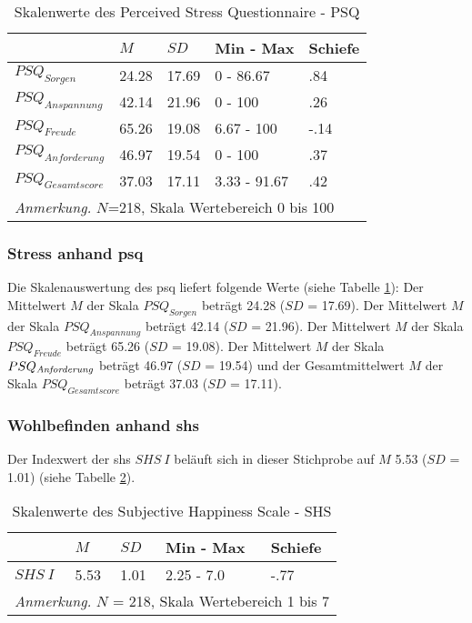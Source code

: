 \begin{table}[ht]
\centering
\captionsetup{margin=70pt, skip=5pt}
\caption{Skalenwerte des Perceived Stress Questionnaire - PSQ}
\label{table:PSQDeskriptiv}
\begin{tabular}{m{6em} m{3em}  m{3em}  m{5em} m{3em}} 
  \hline
  & $M$ & $SD$ & Min - Max & Schiefe\\
  \hline
  $PSQ_{Sorgen}$ & 24.28 & 17.69 & 0 - 86.67 & .84 \\
  $PSQ_{Anspannung}$ & 42.14 & 21.96 & 0 - 100 & .26\\
  $PSQ_{Freude}$ & 65.26 & 19.08 & 6.67 - 100 & -.14\\
  $PSQ_{Anforderung}$ & 46.97 & 19.54 & 0 - 100 & .37 \\
  $PSQ_{Gesamtscore}$ & 37.03 & 17.11 & 3.33 - 91.67 & .42\\
  \hline
  \multicolumn{5}{l}{\textit{Anmerkung.} $N$=218, Skala Wertebereich 0 bis 100}\\
\end{tabular}
\end{table}

\subsubsection{Stress anhand \acrshort{psq}}
Die Skalenauswertung des \acrfull{psq} liefert folgende Werte (siehe Tabelle \ref{table:PSQDeskriptiv}): Der Mittelwert $M$ der Skala $PSQ_{Sorgen}$ beträgt 24.28 ($SD$ = 17.69). Der Mittelwert $M$ der Skala $PSQ_{Anspannung}$ beträgt 42.14 ($SD$ = 21.96). Der Mittelwert $M$ der Skala $PSQ_{Freude}$ beträgt 65.26 ($SD$ = 19.08). Der Mittelwert $M$ der Skala $PSQ_{\text{\textit{Anforderung}}}$ beträgt 46.97 ($SD$ = 19.54) und der Gesamtmittelwert $M$ der Skala $PSQ_{Gesamtscore}$ beträgt 37.03 ($SD$ = 17.11).


\subsubsection{Wohlbefinden anhand \acrshort{shs}}
Der Indexwert der \acrfull{shs} $SHS~I$ beläuft sich in dieser Stichprobe auf $M$ 5.53 ($SD$ = 1.01) (siehe Tabelle \ref{table:SHSDeskriptiv}).

\begin{table}[ht]
\centering
\captionsetup{margin=80pt, skip=5pt}
\caption{Skalenwerte des Subjective Happiness Scale - SHS}
\label{table:SHSDeskriptiv}
\begin{tabular}{m{6em} m{3em}  m{3em}  m{5em} m{3em}} 
  \hline
  & $M$ & $SD$ & Min - Max & Schiefe\\
  \hline
  $SHS~I$ & 5.53 & 1.01 & 2.25 - 7.0 & -.77 \\
  \hline
  \multicolumn{5}{l}{\textit{Anmerkung.} $N$ = 218, Skala Wertebereich 1 bis 7}\\
\end{tabular}
\end{table}

